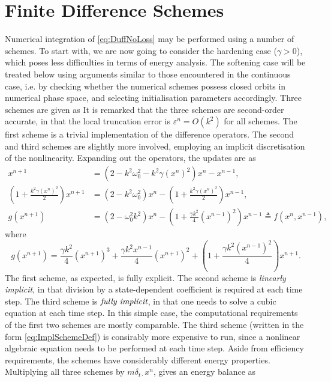 \documentclass[11pt,twoside,a4paper,english]{book}
\newcommand{\dtd}{\delta_{t\cdot}}
\newcommand{\dtt}{\delta_{tt}}
\newcommand{\mtd}{\mu_{t\cdot}}
\begin{document}
\section{Finite Difference Schemes}


Numerical integration of \eqref{eq:DuffNoLoss} may be performed using a number of schemes. To start with, we are now going to consider  the hardening case ($\gamma > 0$), which poses less difficulties in terms of energy analysis. The softening case will be treated below using arguments similar to those encountered in the continuous case, i.e. by checking whether the numerical schemes possess closed orbits in numerical phase space, and selecting initialisation parameters accordingly. Three  schemes are given as
It is remarked that the three schemes are second-order accurate, in that the local truncation error is $\varepsilon^n = O(k^2)$ for all schemes. The first scheme is a trivial implementation of the difference operators. The second and third schemes are slightly more involved, employing an implicit discretisation of the nonlinearity. Expanding out the operators, the updates are as
\begin{subequations}
\begin{align}
x^{n+1} &= \left(2-k^2\omega_0^2 -k^2\gamma (x^n)^2\right) x^n - x^{n-1}, \\
\left(1+\frac{k^2 \gamma (x^n)^2}{2}\right)x^{n+1} &= \left(2-k^2\omega_0^2\right)x^n -\left(1+\frac{k^2 \gamma (x^n)^2}{2}\right)x^{n-1},  \label{eq:DuffLinearlyImpl} \\
g(x^{n+1}) &= (2-\omega_0^2k^2)x^n - \left(1+\frac{\gamma k^2}{4}(x^{n-1})^2\right)x^{n-1} \triangleq f(x^n,x^{n-1}),  \label{eq:DuffImpl}
\end{align}
\end{subequations}
where 
\begin{equation}\label{eq:gdefDuffImpl}
g(x^{n+1}) = \frac{\gamma k^2}{4}(x^{n+1})^3 + \frac{\gamma k^2 x^{n-1}}{4}(x^{n+1})^2+\left(1+\frac{\gamma k^2(x^{n-1})^2}{4} \right)x^{n+1}.
\end{equation}
The first scheme, as expected, is fully explicit. The second scheme is \emph{linearly implicit}, in that division by a state-dependent coefficient is required at each time step. The third scheme is $\emph{fully implicit}$, in that one needs to solve a cubic equation at each time step. In this simple case, the computational requirements of the first two schemes are mostly comparable. The third scheme (written in the form \eqref{eq:ImplSchemeDef}) is consirably more expensive to run, since a nonlinear algebraic equation needs to be performed at each time step. Aside from efficiency requirements, the schemes have considerably different energy properties. Multiplying all three schemes  by $m \dtd x^n$, gives an energy balance as
\end{document}

